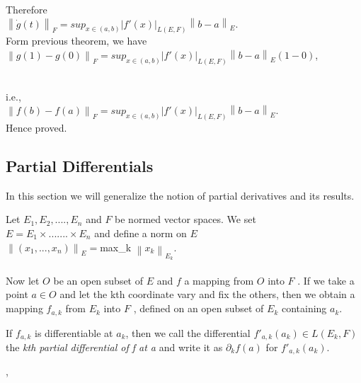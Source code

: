 \documentclass[11 pt]{article}
\theoremstyle{definition}
\theoremstyle{remark}
\newcommand\norm[1]{\left\lVert#1\right\rVert}
\begin{document}
Therefore\\

\hspace*{3cm} $\norm{\dot{g} (t)}_F = sup_{x \in (a,b)}|f'(x)|_{L(E,F)} \norm{b-a}_E$.
\newpage
\\ Form previous theorem, we have\\

\hspace*{3cm} $\norm{g(1)- g(0)}_F = sup_{x \in (a,b)}|f'(x)|_{L(E,F)} \norm{b-a}_E (1-0)$,

\\	i.e.,\\

\hspace*{3cm} $\norm{f(b)- f(a)}_F = sup_{x \in (a,b)}|f'(x)|_{L(E,F)} \norm{b-a}_E$.\\

Hence proved.\\

\subsection{Partial Differentials}
In this section we will generalize the notion of partial derivatives and its results.

Let $E_1, E_2,....,E_n$ and $F$ be normed vector spaces. We set\\
\hspace{3cm} $E = E_1 \times.......\times E_n$ and define a norm on $E$\\

\hspace*{3cm} $ \norm{(x_1,...,x_n)}_E = $max_k $\norm{x_k}_{E_k}$.\\
\\


Now let $O$ be an open subset of $E$ and $f$ a mapping from $O$ into $F$ . If we take a
point $a \in O$ and let the kth coordinate vary and fix the others, then we obtain a
mapping $f_{a,k}$ from $E_k$ into $F$ , defined on an open subset of $E_k$ containing $a_k$.

If $f_{a,k}$ is differentiable at $a_k$, then we call the differential $f'_{a,k}(a_k) \in L(E_k, F)$
the \textit{kth partial differential of f at a} and write it as $\partial_k f(a)$ for $f'_{a,k}(a_k)$. 

,\\
\end{document}
